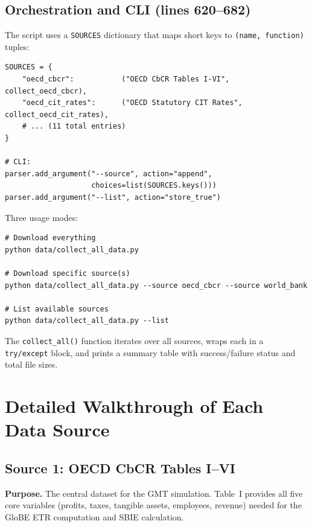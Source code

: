 \documentclass[12pt,a4paper]{article}
\begin{document}
\subsection{Orchestration and CLI (lines 620--682)}

The script uses a \texttt{SOURCES} dictionary that maps short keys to \texttt{(name, function)} tuples:

\begin{lstlisting}[caption={Source registry and CLI},firstnumber=620]
SOURCES = {
    "oecd_cbcr":           ("OECD CbCR Tables I-VI",   collect_oecd_cbcr),
    "oecd_cit_rates":      ("OECD Statutory CIT Rates", collect_oecd_cit_rates),
    # ... (11 total entries)
}

# CLI:
parser.add_argument("--source", action="append",
                    choices=list(SOURCES.keys()))
parser.add_argument("--list", action="store_true")
\end{lstlisting}

Three usage modes:

\begin{lstlisting}[style=shellstyle,caption={Script usage}]
# Download everything
python data/collect_all_data.py

# Download specific source(s)
python data/collect_all_data.py --source oecd_cbcr --source world_bank

# List available sources
python data/collect_all_data.py --list
\end{lstlisting}

The \texttt{collect\_all()} function iterates over all sources, wraps each in a \texttt{try/except} block, and prints a summary table with success/failure status and total file sizes.


\section{Detailed Walkthrough of Each Data Source}\label{sec:walkthrough}

\subsection{Source 1: OECD CbCR Tables I--VI}\label{sec:src_cbcr}

\textbf{Purpose.}
The central dataset for the GMT simulation.
Table~I provides all five core variables (profits, taxes, tangible assets, employees, revenue) needed for the GloBE ETR computation and SBIE calculation.
\end{document}
